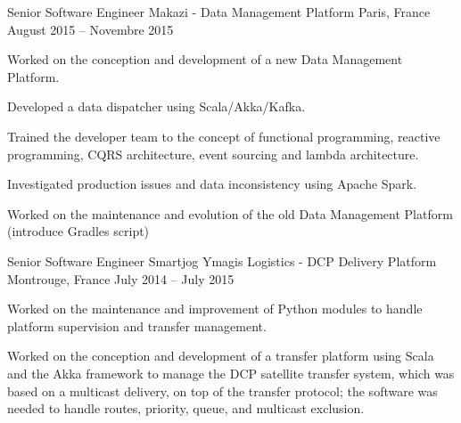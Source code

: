 \begin{cventries}
  \cventry
    {Senior Software Engineer} %
    {Makazi - Data Management Platform} %
    {Paris, France} %
    {August 2015 – Novembre 2015} %
    {
      \begin{cvitems} %
        \item {Worked on the conception and development of a new Data Management Platform.}
        \item {Developed a data dispatcher using Scala/Akka/Kafka.}
        \item {Trained the developer team to the concept of functional programming, reactive programming, CQRS architecture, event sourcing and lambda architecture.}
        \item {Investigated production issues and data inconsistency using Apache Spark.}
        \item {Worked on the maintenance and evolution of the old Data Management Platform (introduce Gradles script)}
      \end{cvitems}
    }

  \cventry
    {Senior Software Engineer} %
    {Smartjog Ymagis Logistics - DCP Delivery Platform} %
    {Montrouge, France} %
    {July 2014 – July 2015} %
    {
      \begin{cvitems} %
        \item {Worked on the maintenance and improvement of Python modules to handle platform supervision and transfer management.}
        \item {Worked on the conception and development of a transfer platform using Scala and the Akka framework to manage the DCP satellite transfer system, which was based on a multicast delivery, on top of the transfer protocol; the software was needed to handle routes, priority, queue, and multicast exclusion.}
      \end{cvitems}
    }


\end{cventries}

